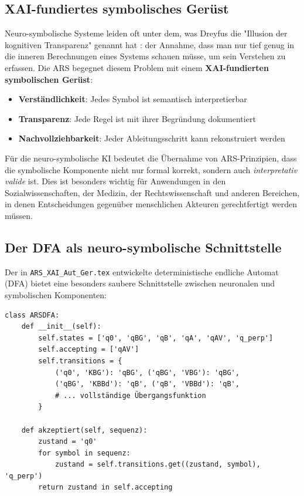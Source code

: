 \documentclass[12pt,a4paper]{article}
\begin{document}
\subsection{XAI-fundiertes symbolisches Gerüst}

Neuro-symbolische Systeme leiden oft unter dem, was Dreyfus die "Illusion der 
kognitiven Transparenz" genannt hat \citep{dreyfus1972what}: der Annahme, dass 
man nur tief genug in die inneren Berechnungen eines Systems schauen müsse, um 
sein Verstehen zu erfassen. Die ARS begegnet diesem Problem mit einem 
\textbf{XAI-fundierten symbolischen Gerüst}:

\begin{itemize}
    \item \textbf{Verständlichkeit}: Jedes Symbol ist semantisch interpretierbar
    \item \textbf{Transparenz}: Jede Regel ist mit ihrer Begründung dokumentiert
    \item \textbf{Nachvollziehbarkeit}: Jeder Ableitungsschritt kann rekonstruiert werden
\end{itemize}

Für die neuro-symbolische KI bedeutet die Übernahme von ARS-Prinzipien, dass die 
symbolische Komponente nicht nur formal korrekt, sondern auch \textit{interpretativ 
valide} ist. Dies ist besonders wichtig für Anwendungen in den Sozialwissenschaften, 
der Medizin, der Rechtswissenschaft und anderen Bereichen, in denen Entscheidungen 
gegenüber menschlichen Akteuren gerechtfertigt werden müssen.

\subsection{Der DFA als neuro-symbolische Schnittstelle}

Der in \texttt{ARS\_XAI\_Aut\_Ger.tex} entwickelte deterministische endliche 
Automat (DFA) bietet eine besonders saubere Schnittstelle zwischen neuronalen 
und symbolischen Komponenten:

\begin{lstlisting}[caption=DFA als neuro-symbolische Schnittstelle]
class ARSDFA:
    def __init__(self):
        self.states = ['q0', 'qBG', 'qB', 'qA', 'qAV', 'q_perp']
        self.accepting = ['qAV']
        self.transitions = {
            ('q0', 'KBG'): 'qBG', ('qBG', 'VBG'): 'qBG',
            ('qBG', 'KBBd'): 'qB', ('qB', 'VBBd'): 'qB',
            # ... vollständige Übergangsfunktion
        }
    
    def akzeptiert(self, sequenz):
        zustand = 'q0'
        for symbol in sequenz:
            zustand = self.transitions.get((zustand, symbol), 'q_perp')
        return zustand in self.accepting
\end{lstlisting}
\end{document}
